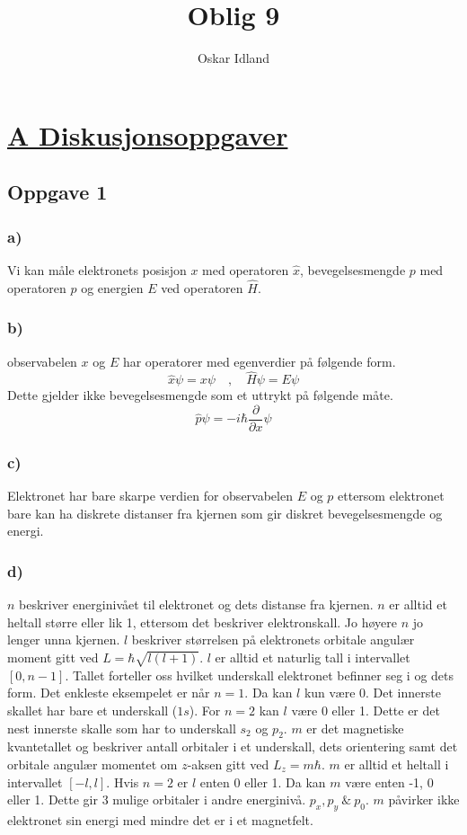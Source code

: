 \documentclass[norsk]{article}
\author{Oskar Idland}
\title{Oblig 9}
\date{}
\begin{document}
\maketitle
\newpage
\section*{\underline{A Diskusjonsoppgaver}}
\subsection*{Oppgave 1}
\subsubsection*{a)}
Vi kan måle elektronets posisjon $x$ med operatoren $\hat{x}$, bevegelsesmengde $p$ med operatoren $\hat{p}$ og energien $E$ ved operatoren $\hat{H}$. 

\subsubsection*{b)}
observabelen $x$ og $E$ har operatorer med egenverdier på følgende form. 
\[
\hat{x}ψ = xψ \quad , \quad \hat{H}ψ = Eψ
\]
Dette gjelder ikke bevegelsesmengde som et uttrykt på følgende måte.  
\[
\hat{p}ψ = -iℏ\frac{∂}{∂x}ψ
\]

\subsubsection*{c)}
Elektronet har bare skarpe verdien for observabelen $E$ og $p$ ettersom elektronet bare kan ha diskrete distanser fra kjernen som gir diskret bevegelsesmengde og energi. 

\subsubsection*{d)}
$n$ beskriver energinivået til elektronet og dets distanse fra kjernen. $n$ er alltid et heltall større eller lik 1, ettersom det beskriver elektronskall. Jo høyere $n$ jo lenger unna kjernen.
\newline\newline
$l$ beskriver størrelsen på elektronets orbitale angulær moment gitt ved $L = ℏ\sqrt{l(l+1)}$. $l$ er alltid et naturlig tall i intervallet $[0, n-1]$. Tallet forteller oss hvilket underskall elektronet befinner seg i og dets form. Det enkleste eksempelet er når $n=1$. Da kan $l$ kun være 0. Det innerste skallet har bare et underskall ($1s$). For $n=2$ kan $l$ være 0 eller 1. Dette er  det nest innerste skalle som har to underskall $s_2$ og $p_2$.
\newline\newline
$m$ er det magnetiske kvantetallet og beskriver antall orbitaler i et underskall, dets orientering samt det orbitale angulær momentet om $z$-aksen gitt ved $L_z = mℏ$. $m$ er alltid et heltall i intervallet $[-l,l]$. Hvis $n=2$ er $l$ enten 0 eller 1. Da kan $m$ være enten -1, 0 eller 1. Dette gir 3 mulige orbitaler i andre energinivå. $p_x, p_y\ \&\ p_0$. $m$ påvirker ikke elektronet sin energi med mindre det er i et magnetfelt. 
\end{document}
